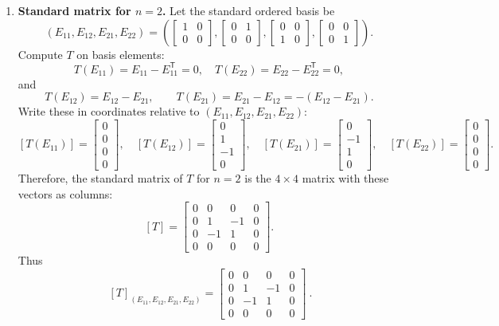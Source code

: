 \documentclass[12pt]{article}
\begin{document}
\begin{enumerate}[label=(\alph*)]
\item \textbf{Standard matrix for $n=2$.}
Let the standard ordered basis be
\[
(E_{11},E_{12},E_{21},E_{22})
=
\left(
\begin{bmatrix}1&0\\0&0\end{bmatrix},
\begin{bmatrix}0&1\\0&0\end{bmatrix},
\begin{bmatrix}0&0\\1&0\end{bmatrix},
\begin{bmatrix}0&0\\0&1\end{bmatrix}
\right).
\]
Compute $T$ on basis elements:
\[
T(E_{11})=E_{11}-E_{11}^{\mathsf{T}}=0,\quad
T(E_{22})=E_{22}-E_{22}^{\mathsf{T}}=0,
\]
and
\[
T(E_{12})=E_{12}-E_{21},\qquad T(E_{21})=E_{21}-E_{12}=-(E_{12}-E_{21}).
\]
Write these in coordinates relative to $(E_{11},E_{12},E_{21},E_{22})$:
\[
[T(E_{11})]=\begin{bmatrix}0\\0\\0\\0\end{bmatrix},\quad
[T(E_{12})]=\begin{bmatrix}0\\1\\-1\\0\end{bmatrix},\quad
[T(E_{21})]=\begin{bmatrix}0\\-1\\1\\0\end{bmatrix},\quad
[T(E_{22})]=\begin{bmatrix}0\\0\\0\\0\end{bmatrix}.
\]
Therefore, the standard matrix of $T$ for $n=2$ is the $4\times 4$ matrix with these vectors as columns:
\[
[T]=
\begin{bmatrix}
0&0&0&0\\
0&1&-1&0\\
0&-1&1&0\\
0&0&0&0
\end{bmatrix}.
\]
Thus
\[
\boxed{\ [T]_{(E_{11},E_{12},E_{21},E_{22})}=
\begin{bmatrix}
0&0&0&0\\
0&1&-1&0\\
0&-1&1&0\\
0&0&0&0
\end{bmatrix}\ }.
\]


\end{enumerate}
\end{document}
